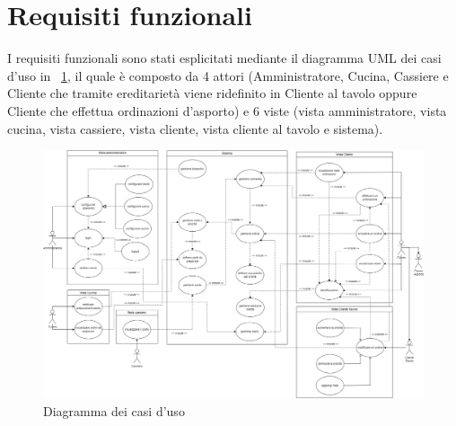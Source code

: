 \section{Requisiti funzionali}
I requisiti funzionali sono stati esplicitati mediante il diagramma UML dei casi d’uso in \figurename~\ref{fig:use_cases_diagram}, il quale è composto da 4 attori (Amministratore, Cucina, Cassiere e Cliente che tramite ereditarietà viene ridefinito in Cliente al tavolo oppure Cliente che effettua ordinazioni d’asporto) e 6 viste (vista amministratore, vista cucina, vista cassiere, vista cliente, vista cliente al tavolo e sistema).

\begin{figure}[htbp]

	\centering
	
	
	\includegraphics[scale=0.25]{iterazione0/images/use_cases_diagram}
	\caption{Diagramma dei casi d'uso\label{fig:use_cases_diagram}}
\end{figure}


